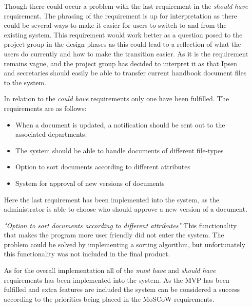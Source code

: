 Though there could occur a problem with the last requirement in the \textit{should have} requirement.
The phrasing of the requirement is up for interpretation as there could be several ways to make it easier for users to switch to and from the existing system.
This requirement would work better as a question posed to the project group in the design phases as this could lead to a reflection of what the users do currently and how to make the transition easier.
As it is the requirement remains vague, and the project group has decided to interpret it as that Ipsen and secretaries should easily be able to transfer current handbook document files to the system.

In relation to the \textit{could have} requirements only one have been fulfilled.
The requirements are as follows:

 \begin{itemize}
 	\item
    When a document is updated, a notification should be sent out to the associated departments.
	\item
    The system should be able to handle documents of different file-types
    \item
    Option to sort documents according to different attributes
    \item
    System for approval of new versions of documents
\end{itemize}

Here the last requirement has been implemented into the system, as the administrator is able to choose who should approve a new version of a document.

\textit{"Option to sort documents according to different attributes"}
This functionality that makes the program more user friendly did not enter the system.
The problem could be solved by implementing a sorting algorithm, but unfortunately this functionality was not included in the final product.

As for the overall implementation all of the \textit{must have} and \textit{should have} requirements has been implemented into the system.
As the MVP has been fulfilled and extra features are included the system can be considered a success according to the priorities being placed in the MoSCoW requirements.


